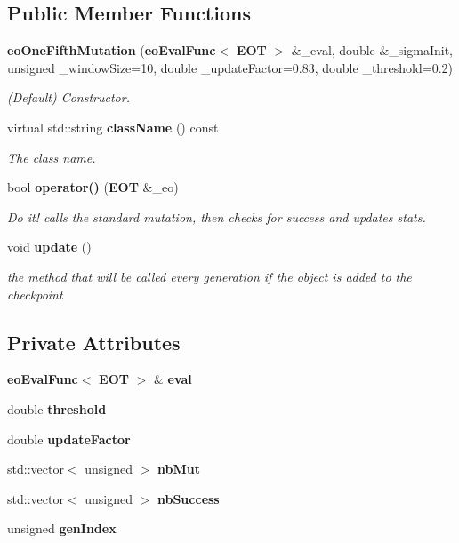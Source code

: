 \subsection*{Public Member Functions}
\begin{CompactItemize}
\item 
{\bf eo\-One\-Fifth\-Mutation} ({\bf eo\-Eval\-Func}$<$ {\bf EOT} $>$ \&\_\-eval, double \&\_\-sigma\-Init, unsigned \_\-window\-Size=10, double \_\-update\-Factor=0.83, double \_\-threshold=0.2)
\begin{CompactList}\small\item\em (Default) Constructor. \item\end{CompactList}\item 
virtual std::string {\bf class\-Name} () const \label{classeo_one_fifth_mutation_a1}

\begin{CompactList}\small\item\em The class name. \item\end{CompactList}\item 
bool {\bf operator()} ({\bf EOT} \&\_\-eo)
\begin{CompactList}\small\item\em Do it! calls the standard mutation, then checks for success and updates stats. \item\end{CompactList}\item 
void {\bf update} ()\label{classeo_one_fifth_mutation_a3}

\begin{CompactList}\small\item\em the method that will be called every generation if the object is added to the checkpoint \item\end{CompactList}\end{CompactItemize}
\subsection*{Private Attributes}
\begin{CompactItemize}
\item 
{\bf eo\-Eval\-Func}$<$ {\bf EOT} $>$ \& {\bf eval}\label{classeo_one_fifth_mutation_r0}

\item 
double {\bf threshold}\label{classeo_one_fifth_mutation_r1}

\item 
double {\bf update\-Factor}\label{classeo_one_fifth_mutation_r2}

\item 
std::vector$<$ unsigned $>$ {\bf nb\-Mut}\label{classeo_one_fifth_mutation_r3}

\item 
std::vector$<$ unsigned $>$ {\bf nb\-Success}\label{classeo_one_fifth_mutation_r4}

\item 
unsigned {\bf gen\-Index}\label{classeo_one_fifth_mutation_r5}

\end{CompactItemize}


